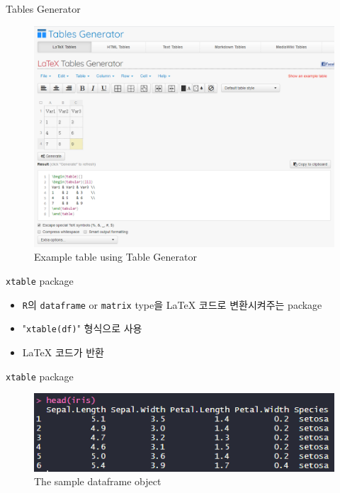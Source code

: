 \documentclass{beamer}
\begin{document}
\begin{frame}{Tables Generator}
	\begin{figure}[h] %
		\begin{center}
			\includegraphics[width=0.7\linewidth]{img/table_generator.png}
		\end{center}
		\caption{Example table using Table Generator}
		\label{fig:long}
		\label{fig:onecol}
	\end{figure}
\end{frame}



\begin{frame}{\texttt{xtable} package}
	\begin{itemize}
		\item {
			\texttt{R}의 \texttt{dataframe} or \texttt{matrix} type을 \textrm{\LaTeX} 코드로 변환시켜주는 package
		}
		\item {
			"\texttt{xtable(df)}" 형식으로 사용
		}
		\item {
			\textrm{\LaTeX} 코드가 반환
		}
	\end{itemize}
\end{frame}

\begin{frame}{\texttt{xtable} package}
	\begin{figure}[h] %
		\begin{center}
			\includegraphics[width=0.9\linewidth]{img/xtable1.png}
		\end{center}
		\caption{The sample dataframe object}
		\label{fig:long}
		\label{fig:onecol}
	\end{figure}
\end{frame}
\end{document}
